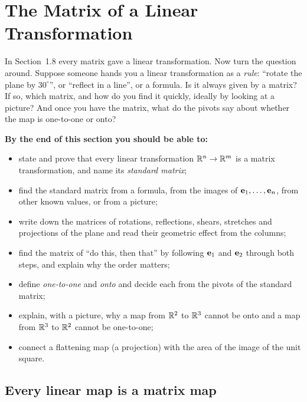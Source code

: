 \documentclass[11pt]{article}
\begin{document}
\section{The Matrix of a Linear Transformation}

\begin{guide}
In Section~1.8 every matrix gave a linear transformation. Now turn the question around. Suppose someone hands you a linear transformation as a \emph{rule}: ``rotate the plane by $30^\circ$'', or ``reflect in a line'', or a formula. Is it always given by a matrix? If so, which matrix, and how do you find it quickly, ideally by looking at a picture? And once you have the matrix, what do the pivots say about whether the map is one-to-one or onto?
\end{guide}

\textbf{By the end of this section you should be able to:}
\begin{itemize}
  \item state and prove that every linear transformation $\mathbb{R}^n\to\mathbb{R}^m$ is a matrix transformation, and name its \emph{standard matrix};
  \item find the standard matrix from a formula, from the images of $\mathbf{e}_1,\dots,\mathbf{e}_n$, from other known values, or from a picture;
  \item write down the matrices of rotations, reflections, shears, stretches and projections of the plane and read their geometric effect from the columns;
  \item find the matrix of ``do this, then that'' by following $\mathbf{e}_1$ and $\mathbf{e}_2$ through both steps, and explain why the order matters;
  \item define \emph{one-to-one} and \emph{onto} and decide each from the pivots of the standard matrix;
  \item explain, with a picture, why a map from $\mathbb{R}^2$ to $\mathbb{R}^3$ cannot be onto and a map from $\mathbb{R}^3$ to $\mathbb{R}^2$ cannot be one-to-one;
  \item connect a flattening map (a projection) with the area of the image of the unit square.
\end{itemize}

\subsection*{Every linear map is a matrix map}
\end{document}
